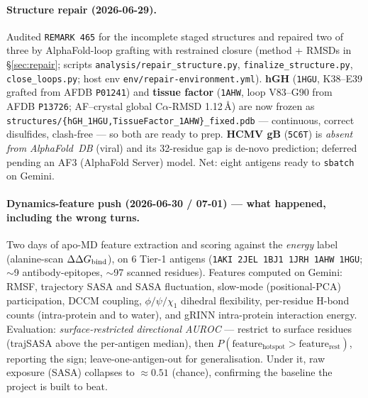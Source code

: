 \paragraph{Structure repair (2026-06-29).} Audited \texttt{REMARK 465} for the incomplete staged
structures and repaired two of three by AlphaFold-loop grafting with restrained closure (method +
RMSDs in \S\ref{sec:repair}; scripts \texttt{analysis/repair\_structure.py},
\texttt{finalize\_structure.py}, \texttt{close\_loops.py}; host env
\texttt{env/repair-environment.yml}). \textbf{hGH} (\texttt{1HGU}, K38--E39 grafted from AFDB
\texttt{P01241}) and \textbf{tissue factor} (\texttt{1AHW}, loop V83--G90 from AFDB
\texttt{P13726}; AF--crystal global C$\alpha$-RMSD 1.12\,\AA) are now frozen as
\texttt{structures/\{hGH\_1HGU,TissueFactor\_1AHW\}\_fixed.pdb} --- continuous, correct disulfides,
clash-free --- so both are ready to prep. \textbf{HCMV gB} (\texttt{5C6T}) is \emph{absent from
AlphaFold~DB} (viral) and its 32-residue gap is de-novo prediction; deferred pending an AF3
(AlphaFold Server) model. Net: eight antigens ready to \texttt{sbatch} on Gemini.

\paragraph{Dynamics-feature push (2026-06-30 / 07-01) --- what happened, including the wrong turns.}
Two days of apo-MD feature extraction and scoring against the \emph{energy} label (alanine-scan
$\Delta\Delta G_{\mathrm{bind}}$), on 6 Tier-1 antigens (\texttt{1AKI 2JEL 1BJ1 1JRH 1AHW 1HGU}; $\sim$9 antibody-epitopes,
$\sim$97 scanned residues). Features computed on Gemini: RMSF, trajectory SASA and SASA fluctuation,
slow-mode (positional-PCA) participation, DCCM coupling, $\phi/\psi/\chi_1$ dihedral flexibility,
per-residue H-bond counts (intra-protein and to water), and gRINN intra-protein interaction energy.
Evaluation: \emph{surface-restricted directional AUROC} --- restrict to surface residues (trajSASA
above the per-antigen median), then $P(\text{feature}_{\text{hotspot}} > \text{feature}_{\text{rest}})$,
reporting the sign; leave-one-antigen-out for generalisation. Under it, raw exposure (SASA) collapses
to $\approx 0.51$ (chance), confirming the baseline the project is built to beat.


